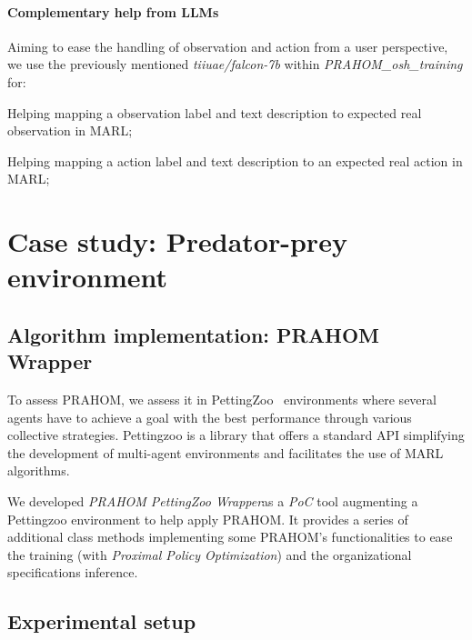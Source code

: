 \documentclass[runningheads]{llncs}
\begin{document}
\paragraph{Complementary help from LLMs}

Aiming to ease the handling of observation and action from a user perspective, we use the previously mentioned \emph{tiiuae/falcon-7b} within \emph{PRAHOM\_osh\_training} for:
\begin{enumerate*}[label=\roman*),itemjoin={;\quad}]
    \item Helping mapping a observation label and text description to expected real observation in MARL;
    \item Helping mapping a action label and text description to an expected real action in MARL;
\end{enumerate*}


\section{Case study: Predator-prey environment}

\subsection{Algorithm implementation: PRAHOM Wrapper}


To assess PRAHOM, we assess it in PettingZoo~\cite{Terry2021} environments where several agents have to achieve a goal with the best performance through various collective strategies. Pettingzoo is a library that offers a standard API simplifying the development of multi-agent environments and facilitates the use of MARL algorithms.

We developed \emph{PRAHOM PettingZoo Wrapper}\footnotemark[2] as a \emph{PoC} tool augmenting a Pettingzoo environment to help apply PRAHOM. It provides a series of additional class methods implementing some PRAHOM's functionalities to ease the training (with \emph{Proximal Policy Optimization}) and the organizational specifications inference.

\subsection{Experimental setup}
\end{document}
